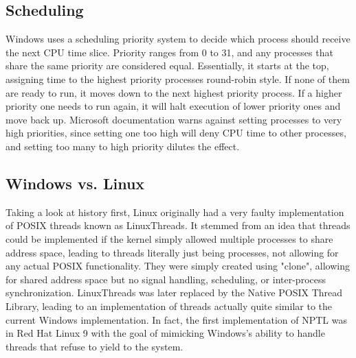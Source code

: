 \documentclass[draftclsnofoot,onecolumn,journal,letterpaper,10pt]{IEEEtran}
\begin{document}
\subsection{Scheduling}
Windows uses a scheduling priority system to decide which process should receive the next CPU time slice. Priority ranges from 0 to 31, and any processes that share the same priority are considered equal. Essentially, it starts at the top, assigning time to the highest priority processes round-robin style. If none of them are ready to run, it moves down to the next highest priority process. If a higher priority one needs to run again, it will halt execution of lower priority ones and move back up. Microsoft documentation warns against setting processes to very high priorities, since setting one too high will deny CPU time to other processes, and setting too many to high priority dilutes the effect.

\subsection{Windows vs. Linux}
Taking a look at history first, Linux originally had a very faulty implementation of POSIX threads known as LinuxThreads. It stemmed from an idea that threads could be implemented if the kernel simply allowed multiple processes to share address space, leading to threads literally just being processes, not allowing for any actual POSIX functionality\cite{distinction}. They were simply created using "clone", allowing for shared address space but no signal handling, scheduling, or inter-process synchronization. LinuxThreads was later replaced by the Native POSIX Thread Library, leading to an implementation of threads actually quite similar to the current Windows implementation. In fact, the first implementation of NPTL was in Red Hat Linux 9 with the goal of mimicking Windows's ability to handle threads that refuse to yield to the system\cite{NPTL}.
\end{document}
